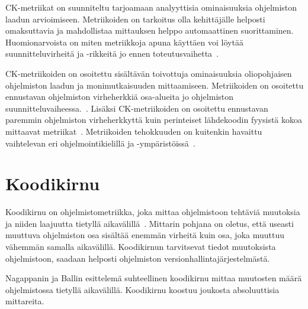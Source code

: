\documentclass[finnish]{tktltiki2}
\theoremstyle{definition}
\theoremstyle{remark}
\begin{document}
CK-metriikat on suunniteltu tarjoamaan analyyttisia ominaisuuksia ohjelmiston laadun arvioimiseen. Metriikoiden on tarkoitus olla kehittäjälle helposti omaksuttavia ja mahdollistaa mittauksen helppo automaattinen suorittaminen. Huomionarvoista on miten metriikkoja apuna käyttäen voi löytää suunnitteluvirheitä ja -rikkeitä jo ennen toteutusvaihetta~\cite{CK94}. 

CK-metriikoiden on osoitettu sisältävän toivottuja ominaisuuksia oliopohjaisen ohjelmiston laadun ja monimutkaisuuden mittaamiseen. Metriikoiden on osoitettu ennustavan ohjelmiston virheherkkiä osa-alueita jo ohjelmiston suunnitteluvaiheessa.~\cite{CK94, BBM96, SK03}. Lisäksi CK-metriikoiden on osoitettu ennustavan paremmin ohjelmiston virheherkkyttä kuin perinteiset lähdekoodin fyysistä kokoa mittaavat metriikat~\cite{BB96}. Metriikoiden tehokkuuden on kuitenkin havaittu vaihtelevan eri ohjelmointikielillä ja -ympäristöissä~\cite{SK03}.


\section{Koodikirnu}

Koodikirnu on ohjelmistometriikka, joka mittaa ohjelmistoon tehtäviä muutoksia ja niiden laajuutta tietyllä aikavälillä~\cite{NB05}. Mittarin pohjana on oletus, että useasti muuttuva ohjelmiston osa sisältää enemmän virheitä kuin osa, joka muuttuu vähemmän samalla aikavälillä. Koodikirnun tarvitsevat tiedot muutoksista ohjelmistoon, saadaan helposti ohjelmiston versionhallintajärjestelmästä.

Nagappanin ja Ballin esittelemä suhteellinen koodikirnu mittaa muutosten määrä ohjelmistossa tietyllä aikavälillä. Koodikirnu koostuu joukosta absoluuttisia mittareita.
\end{document}
